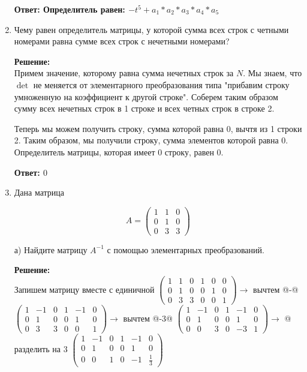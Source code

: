 \documentclass[a4paper,12pt]{article}
\makeatletter
\newcommand*{\rom}[1]{\expandafter\@slowromancap\romannumeral #1@}
\makeatother
\begin{document}
\begin{enumerate}
\textbf{Ответ: Определитель равен: $-t^5+a_1*a_2*a_3*a_4*a_5$}


\item Чему равен определитель матрицы, у которой сумма всех строк с четными номерами равна сумме всех строк с
нечетными номерами?

\vspace{5pt}

\textbf{Решение:}\\
Примем значение, которому равна сумма нечетных строк за $N$. Мы знаем, что $\det$ не меняется от элементарного преобразования типа "прибавим строку умноженную на коэффициент к другой строке". Соберем таким образом сумму всех нечетных строк в 1 строке и всех четных строк в строке 2.

Теперь мы можем получить строку, сумма которой равна 0, вычтя из 1 строки 2. Таким образом, мы получили строку, сумма элементов которой равна 0. Определитель матрицы, которая имеет 0 строку, равен 0.

\textbf{Ответ:  $0$}


\item Дана матрица 

$$
A=\begin{pmatrix}
1&1&0\\
0&1&0\\
0&3&3
\end{pmatrix}
$$


а) Найдите матрицу $A^{-1}$ с помощью элементарных преобразований.

\textbf{Решение:}\\
Запишем матрицу вместе с единичной
$
\left(\begin{array}{ccc|ccc}  
 1&1&0&1&0&0\\
0&1&0&0&1&0\\
0&3&3&0&0&1
\end{array}\right) \rightarrow$ вычтем \rom{1}-\rom{2} \\
$
\left(\begin{array}{ccc|ccc}  
 1&-1&0&1&-1&0\\
0&1&0&0&1&0\\
0&3&3&0&0&1
\end{array}\right) \rightarrow$ вычтем \rom{3}-3\rom{2} $
\left(\begin{array}{ccc|ccc}  
1&-1&0&1&-1&0\\
0&1&0&0&1&0\\
0&0&3&0&-3&1
\end{array}\right) \rightarrow$ \rom{3} разделить на 3 $
\left(\begin{array}{ccc|ccc}  
1&-1&0&1&-1&0\\
0&1&0&0&1&0\\
0&0&1&0&-1&\frac{1}{3}
\end{array}\right)$


\end{enumerate}
\end{document}
